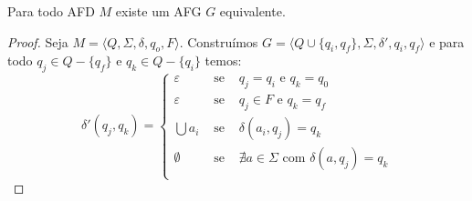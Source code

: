 \begin{lemma}
Para todo AFD $M$ existe um AFG $G$ equivalente.
\end{lemma}
\begin{proof}
  Seja  $M = \langle Q, \Sigma, \delta, q_o, F \rangle$.
  Construímos $G = \langle Q \cup \{q_i, q_f\}, \Sigma, \delta', q_i, q_f \rangle$ e para todo $q_j \in Q - \{q_f\}$ e $q_k \in Q - \{q_i\}$ temos:
\begin{displaymath}
 \delta'(q_j, q_k) = \left\{
    \begin{array}{ccc}
      \varepsilon & \textrm{ se } & q_j = q_i \textrm{ e } q_k = q_0\\
      \varepsilon & \textrm{ se } & q_j \in F \textrm{ e } q_k = q_f\\
      \bigcup a_i & \textrm{ se } & \delta(a_i, q_j) = q_k \\
      \emptyset   & \textrm{ se } & \nexists a \in \Sigma \textrm{ com } \delta(a, q_j) = q_k \\
    \end{array}\right.
\end{displaymath}
\end{proof}



